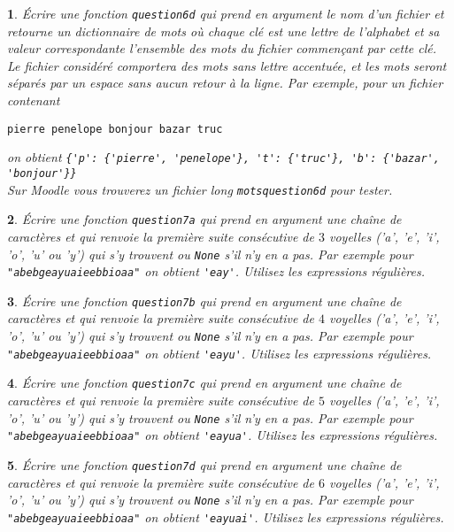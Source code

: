 \documentclass[10pt]{article}
\newtheorem{exi}{}
\newenvironment{exo}{\begin{exi}\em}{\end{exi}}
\begin{document}
\vspace*{-2ex}
\begin{exo}
    Écrire une fonction \verb+question6d+ qui prend en argument le nom d'un fichier
et retourne un dictionnaire de mots où chaque clé est une lettre de
l'alphabet et sa valeur correspondante l'ensemble des mots du fichier commençant
par cette clé. Le fichier considéré comportera des mots sans lettre accentuée, et les mots seront séparés par un espace sans aucun retour
à la ligne.
Par exemple, pour un fichier contenant
\begin{verbatim}
pierre penelope bonjour bazar truc
\end{verbatim}
on obtient \verb+{'p': {'pierre', 'penelope'}, 't': {'truc'}, 'b': {'bazar', 'bonjour'}}+\\
Sur Moodle vous trouverez un fichier long \verb+motsquestion6d+ pour tester.
\end{exo}
\vspace*{-2ex}
\begin{exo}
    Écrire une fonction {\tt question7a}
qui prend en argument une chaîne de caractères et qui renvoie
la première suite consécutive de $3$ voyelles ('a', 'e', 'i', 'o', 'u' ou 'y')
qui s'y trouvent ou \verb+None+
s'il n'y en a pas.
Par exemple pour \verb+"abebgeayuaieebbioaa"+ on obtient
\verb+'eay'+. Utilisez les expressions régulières.
\end{exo}
\vspace*{-2ex}
\begin{exo}
    Écrire une fonction {\tt question7b}
qui prend en argument une chaîne de caractères et qui renvoie
la première suite consécutive de $4$ voyelles ('a', 'e', 'i', 'o', 'u' ou 'y')
qui s'y trouvent ou \verb+None+
s'il n'y en a pas.
Par exemple pour \verb+"abebgeayuaieebbioaa"+ on obtient
\verb+'eayu'+. Utilisez les expressions régulières.
\end{exo}
\vspace*{-2ex}
\begin{exo}
    Écrire une fonction {\tt question7c}
qui prend en argument une chaîne de caractères et qui renvoie
la première suite consécutive de $5$ voyelles ('a', 'e', 'i', 'o', 'u' ou 'y')
qui s'y trouvent ou \verb+None+
s'il n'y en a pas.
Par exemple pour \verb+"abebgeayuaieebbioaa"+ on obtient
\verb+'eayua'+. Utilisez les expressions régulières.
\end{exo}
\vspace*{-2ex}
\begin{exo}
    Écrire une fonction {\tt question7d}
qui prend en argument une chaîne de caractères et qui renvoie
la première suite consécutive de $6$ voyelles ('a', 'e', 'i', 'o', 'u' ou 'y')
qui s'y trouvent ou \verb+None+
s'il n'y en a pas.
Par exemple pour \verb+"abebgeayuaieebbioaa"+ on obtient
\verb+'eayuai'+. Utilisez les expressions régulières.
\end{exo}
\end{document}
